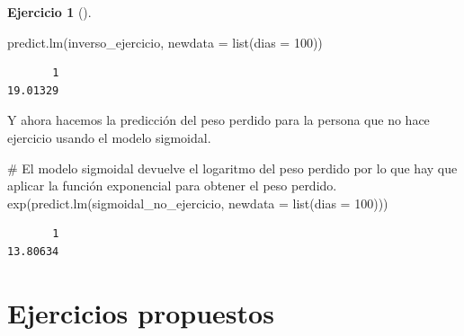 \documentclass[
  a4paper,
]{scrreport}
\newenvironment{Shaded}{\begin{snugshade}}{\end{snugshade}}
\newcommand{\AttributeTok}[1]{\textcolor[rgb]{0.40,0.45,0.13}{#1}}
\newcommand{\CommentTok}[1]{\textcolor[rgb]{0.37,0.37,0.37}{#1}}
\newcommand{\DecValTok}[1]{\textcolor[rgb]{0.68,0.00,0.00}{#1}}
\newcommand{\FunctionTok}[1]{\textcolor[rgb]{0.28,0.35,0.67}{#1}}
\newcommand{\NormalTok}[1]{\textcolor[rgb]{0.00,0.23,0.31}{#1}}
\theoremstyle{definition}
\newtheorem{exercise}{Ejercicio}[chapter]
\theoremstyle{remark}
\begin{document}
\begin{exercise}[]
\begin{enumerate}
\begin{tcolorbox}
\begin{Shaded}
\begin{Highlighting}[]
\FunctionTok{predict.lm}\NormalTok{(inverso\_ejercicio, }\AttributeTok{newdata =} \FunctionTok{list}\NormalTok{(}\AttributeTok{dias =} \DecValTok{100}\NormalTok{))}
\end{Highlighting}
\end{Shaded}

\begin{verbatim}
       1 
19.01329 
\end{verbatim}

  Y ahora hacemos la predicción del peso perdido para la persona que no
  hace ejercicio usando el modelo sigmoidal.

\begin{Shaded}
\begin{Highlighting}[]
\CommentTok{\# El modelo sigmoidal devuelve el logaritmo del peso perdido por lo que hay que aplicar la función exponencial para obtener el peso perdido.}
\FunctionTok{exp}\NormalTok{(}\FunctionTok{predict.lm}\NormalTok{(sigmoidal\_no\_ejercicio, }\AttributeTok{newdata =} \FunctionTok{list}\NormalTok{(}\AttributeTok{dias =} \DecValTok{100}\NormalTok{)))}
\end{Highlighting}
\end{Shaded}

\begin{verbatim}
       1 
13.80634 
\end{verbatim}

  \end{tcolorbox}
\end{enumerate}

\end{exercise}

\section{Ejercicios propuestos}\label{ejercicios-propuestos-3}
\end{document}
